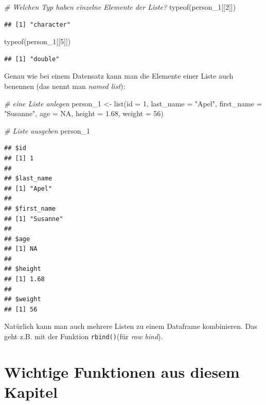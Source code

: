 \documentclass[
]{book}
\newenvironment{Shaded}{\begin{snugshade}}{\end{snugshade}}
\newcommand{\AttributeTok}[1]{\textcolor[rgb]{0.77,0.63,0.00}{#1}}
\newcommand{\CommentTok}[1]{\textcolor[rgb]{0.56,0.35,0.01}{\textit{#1}}}
\newcommand{\ConstantTok}[1]{\textcolor[rgb]{0.00,0.00,0.00}{#1}}
\newcommand{\DecValTok}[1]{\textcolor[rgb]{0.00,0.00,0.81}{#1}}
\newcommand{\FloatTok}[1]{\textcolor[rgb]{0.00,0.00,0.81}{#1}}
\newcommand{\FunctionTok}[1]{\textcolor[rgb]{0.00,0.00,0.00}{#1}}
\newcommand{\NormalTok}[1]{#1}
\newcommand{\OtherTok}[1]{\textcolor[rgb]{0.56,0.35,0.01}{#1}}
\newcommand{\StringTok}[1]{\textcolor[rgb]{0.31,0.60,0.02}{#1}}
\begin{document}
\begin{Shaded}
\begin{Highlighting}[]
\CommentTok{\# Welchen Typ haben einzelne Elemente der Liste?}
\FunctionTok{typeof}\NormalTok{(person\_1[[}\DecValTok{2}\NormalTok{]])}
\end{Highlighting}
\end{Shaded}

\begin{verbatim}
## [1] "character"
\end{verbatim}

\begin{Shaded}
\begin{Highlighting}[]
\FunctionTok{typeof}\NormalTok{(person\_1[[}\DecValTok{5}\NormalTok{]])}
\end{Highlighting}
\end{Shaded}

\begin{verbatim}
## [1] "double"
\end{verbatim}

Genau wie bei einem Datensatz kann man die Elemente einer Liste auch benennen (das nennt man \emph{named list}):

\begin{Shaded}
\begin{Highlighting}[]
\CommentTok{\# eine Liste anlegen}
\NormalTok{person\_1 }\OtherTok{\textless{}{-}} \FunctionTok{list}\NormalTok{(}\AttributeTok{id =} \DecValTok{1}\NormalTok{, }\AttributeTok{last\_name =} \StringTok{"Apel"}\NormalTok{, }\AttributeTok{first\_name =} \StringTok{"Susanne"}\NormalTok{, }\AttributeTok{age =} \ConstantTok{NA}\NormalTok{, }\AttributeTok{height =} \FloatTok{1.68}\NormalTok{, }\AttributeTok{weight =} \DecValTok{56}\NormalTok{)}

\CommentTok{\# Liste ausgeben}
\NormalTok{person\_1}
\end{Highlighting}
\end{Shaded}

\begin{verbatim}
## $id
## [1] 1
## 
## $last_name
## [1] "Apel"
## 
## $first_name
## [1] "Susanne"
## 
## $age
## [1] NA
## 
## $height
## [1] 1.68
## 
## $weight
## [1] 56
\end{verbatim}

Natürlich kann man auch mehrere Listen zu einem Dataframe kombinieren. Das geht z.B. mit der Funktion \texttt{rbind()}(für \emph{row bind}).

\hypertarget{wichtige-funktionen-aus-diesem-kapitel}{%
\section*{Wichtige Funktionen aus diesem Kapitel}\label{wichtige-funktionen-aus-diesem-kapitel}}
\end{document}
